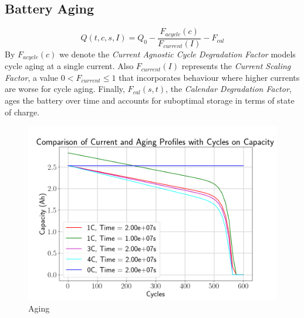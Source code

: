 \documentclass{prettytex/ox/mmsc-special-topic}
\begin{document}

  \subsection{Battery Aging}
  \begin{equation*}
    \label{eq:cap}
    Q (t,c,s,I) = Q_{0} - \frac{F_{acycle}(c)}{F_{current}(I)} - F_{cal}
  \end{equation*}
  By $F_{acycle}(c)$ we denote the \textit{Current Agnostic Cycle Degradation Factor} models cycle aging at a single current.
  Also $F_{current}(I)$ represents the \textit{Current Scaling Factor}, a value $0 < F_{current} \leq 1$ that incorporates behaviour where higher currents are worse for cycle aging.
  Finally, $F_{cal}(s,t)$, the \textit{Calendar Degradation Factor}, ages the battery over time and accounts for suboptimal storage in terms of state of charge.

  \begin{figure}[H]
    \centering
    \includegraphics[width=0.7\linewidth]{figures/aging.png}
    \caption{Aging}
    \label{fig:aging}
  \end{figure}
\end{document}
